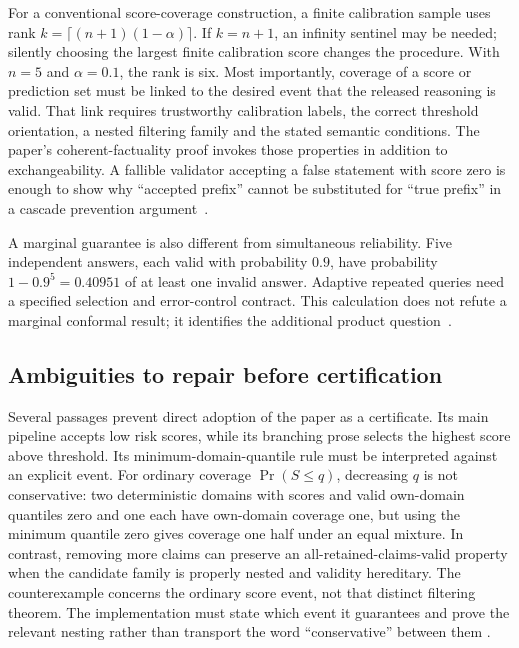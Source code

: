 For a conventional score-coverage construction, a finite calibration sample
uses rank $k=\lceil(n+1)(1-\alpha)\rceil$. If $k=n+1$, an infinity sentinel
may be needed; silently choosing the largest finite calibration score changes
the procedure. With $n=5$ and $\alpha=0.1$, the rank is six. Most importantly,
coverage of a score or prediction set must be linked to the desired event
that the released reasoning is valid. That link requires trustworthy
calibration labels, the correct threshold orientation, a nested filtering
family and the stated semantic conditions. The paper's coherent-factuality
proof invokes those properties in addition to exchangeability. A fallible
validator accepting a false statement with score zero is enough to show why
``accepted prefix'' cannot be substituted for ``true prefix'' in a cascade
prevention argument~\citep{exec23_scientific_conformal,exec23_admission_conformal_reference}.

A marginal guarantee is also different from simultaneous reliability. Five
independent answers, each valid with probability $0.9$, have probability
$1-0.9^5=0.40951$ of at least one invalid answer. Adaptive repeated queries
need a specified selection and error-control contract. This calculation
does not refute a marginal conformal result; it identifies the additional
product question~\citep{exec23_admission_conformal_reference}.

\subsection{Ambiguities to repair before certification}
\label{exec23:admit-repairs}
Several passages prevent direct adoption of the paper as a certificate. Its
main pipeline accepts low risk scores, while its branching prose selects
the highest score above threshold. Its minimum-domain-quantile rule must be
interpreted against an explicit event. For ordinary coverage
$\Pr(S\leq q)$, decreasing $q$ is not conservative: two deterministic
domains with scores and valid own-domain quantiles zero and one each have
own-domain coverage one, but using the minimum quantile zero gives coverage
one half under an equal mixture. In contrast, removing more claims can
preserve an all-retained-claims-valid property when the candidate family is
properly nested and validity hereditary. The counterexample concerns the
ordinary score event, not that distinct filtering theorem. The implementation
must state which event it guarantees and prove the relevant nesting rather
than transport the word ``conservative'' between them
\citep{exec23_scientific_conformal,exec23_admission_conformal_reference}.

